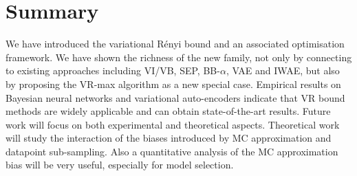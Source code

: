 \section{Summary}
We have introduced the variational R{\'e}nyi bound and an associated optimisation framework. We have shown the richness of the new family, not only by connecting to existing approaches including VI/VB, SEP, BB-$\alpha$, VAE and IWAE, but also by proposing the VR-max algorithm as a new special case. Empirical results on Bayesian neural networks and variational auto-encoders indicate that VR bound methods are widely applicable and can obtain state-of-the-art results.
%
%
Future work will focus on both experimental and theoretical aspects. Theoretical work will study the interaction of the biases introduced by MC approximation and datapoint sub-sampling. Also a quantitative analysis of the MC approximation bias will be very useful, especially for model selection. 